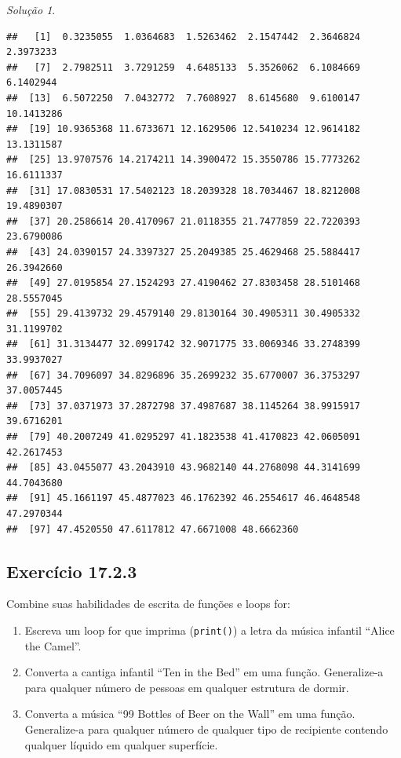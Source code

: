 \documentclass[
]{latex/krantz}
\providecommand{\tightlist}{%
  \setlength{\itemsep}{0pt}\setlength{\parskip}{0pt}}
\theoremstyle{definition}
\theoremstyle{definition}
\theoremstyle{definition}
\theoremstyle{definition}
\theoremstyle{remark}
\newtheorem*{solution}{Solução}
\begin{document}
\begin{solution}
\begin{verbatim}
##   [1]  0.3235055  1.0364683  1.5263462  2.1547442  2.3646824  2.3973233
##   [7]  2.7982511  3.7291259  4.6485133  5.3526062  6.1084669  6.1402944
##  [13]  6.5072250  7.0432772  7.7608927  8.6145680  9.6100147 10.1413286
##  [19] 10.9365368 11.6733671 12.1629506 12.5410234 12.9614182 13.1311587
##  [25] 13.9707576 14.2174211 14.3900472 15.3550786 15.7773262 16.6111337
##  [31] 17.0830531 17.5402123 18.2039328 18.7034467 18.8212008 19.4890307
##  [37] 20.2586614 20.4170967 21.0118355 21.7477859 22.7220393 23.6790086
##  [43] 24.0390157 24.3397327 25.2049385 25.4629468 25.5884417 26.3942660
##  [49] 27.0195854 27.1524293 27.4190462 27.8303458 28.5101468 28.5557045
##  [55] 29.4139732 29.4579140 29.8130164 30.4905311 30.4905332 31.1199702
##  [61] 31.3134477 32.0991742 32.9071775 33.0069346 33.2748399 33.9937027
##  [67] 34.7096097 34.8296896 35.2699232 35.6770007 36.3753297 37.0057445
##  [73] 37.0371973 37.2872798 37.4987687 38.1145264 38.9915917 39.6716201
##  [79] 40.2007249 41.0295297 41.1823538 41.4170823 42.0605091 42.2617453
##  [85] 43.0455077 43.2043910 43.9682140 44.2768098 44.3141699 44.7043680
##  [91] 45.1661197 45.4877023 46.1762392 46.2554617 46.4648548 47.2970344
##  [97] 47.4520550 47.6117812 47.6671008 48.6662360
\end{verbatim}

\end{solution}

\hypertarget{exr17-2-3}{%
\subsection*{Exercício 17.2.3}\label{exr17-2-3}}

Combine suas habilidades de escrita de funções e loops for:

\begin{enumerate}
\def\labelenumi{\alph{enumi}.}
\tightlist
\item
  Escreva um loop for que imprima (\texttt{print()}) a letra da música infantil ``Alice the Camel''.
\item
  Converta a cantiga infantil ``Ten in the Bed'' em uma função. Generalize-a para qualquer número de pessoas em qualquer estrutura de dormir.
\item
  Converta a música ``99 Bottles of Beer on the Wall'' em uma função. Generalize-a para qualquer número de qualquer tipo de recipiente contendo qualquer líquido em qualquer superfície.
\end{enumerate}
\end{document}
